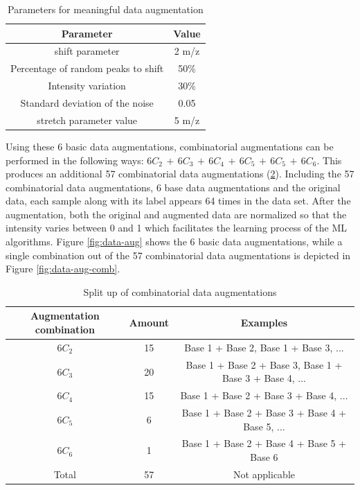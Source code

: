 \begin{table}[ht]
\centering
\begin{tabular}{||c c||} 
 \hline
 \textbf{Parameter} & \textbf{Value }\\ [0.5ex] 
 \hline\hline
 shift parameter & 2 m/z \\ 
 Percentage of random peaks to shift  & 50\% \\
 Intensity variation  & 30\%\\
 Standard deviation of the noise  & 0.05 \\
 stretch parameter value & 5 m/z \\ 
 [1ex] 
 \hline
\end{tabular}
\caption{Parameters for meaningful data augmentation}
\label{table:data-aug-para}
\end{table}

Using these 6 basic data augmentations, combinatorial augmentations can be performed in the following ways: $6C_2\,+\,6C_3\,+\,6C_4\,+\,6C_5\,+\,6C_5\,+\,6C_6$. 
This produces an additional 57 combinatorial data augmentations (\cref{table:data-aug-comb}).
Including the 57 combinatorial data augmentations, 6 base data augmentations and the original data, each sample along with its label appears 64 times in the data set.
After the augmentation, both the original and augmented data are normalized so that the intensity varies between 0 and 1 which facilitates the learning process of the ML algorithms.
Figure \ref{fig:data-aug} shows the 6 basic data augmentations, while a single combination out of the 57 combinatorial data augmentations is depicted in Figure \ref{fig:data-aug-comb}.

\begin{table}[ht]
\centering
\begin{tabular}{||c|c|c||} 
 \hline
 \textbf{Augmentation combination} & \textbf{Amount} & \textbf{Examples}\\ [0.5ex] 
 \hline\hline
 $6C_2$ & 15 & Base 1 + Base 2, Base 1 + Base 3, ... \\ 
$6C_3$ & 20 & Base 1 + Base 2 + Base 3, Base 1 + Base 3 + Base 4, ... \\
$6C_4$ & 15 & Base 1 + Base 2 + Base 3 + Base 4, ... \\
$6C_5$ & 6 & Base 1 + Base 2 + Base 3 + Base 4 + Base 5, ... \\
 $6C_6$ & 1 & Base 1 + Base 2 + Base 4 + Base 5 + Base 6 \\
  Total & 57 & Not applicable \\ 
 [1ex] 
 \hline
\end{tabular}
\caption{Split up of combinatorial data augmentations}
\label{table:data-aug-comb}
\end{table}


